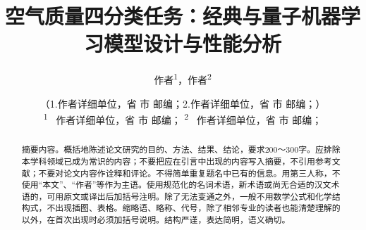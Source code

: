 \documentclass[10pt,a4paper,twoside]{article}
\title{\heiti \zihao{-2} 空气质量四分类任务：经典与量子机器学习模型设计与性能分析}%
\author{\kaishu \zihao{4} 作者\textsuperscript{1}，作者\textsuperscript{2}}%
\date{{\kaishu \zihao{5} （1.作者详细单位，省 市 邮编；2.作者详细单位，省 市 邮编；）}\\
\textsuperscript{1}~{\kaishu \zihao{5} 作者详细单位，省 市 邮编；} 
\textsuperscript{2}~{\kaishu \zihao{5} 作者详细单位，省 市 邮编；}}%
\numberwithin{figure}{section}%
\numberwithin{table}{section}%
\begin{document}

\songti%

\maketitle%



\renewcommand{\abstractname}{\zihao{-5} \heiti \mdseries 摘\quad 要}
\begin{abstract}
    摘要内容。概括地陈述论文研究的目的、方法、结果、结论，要求200～300字。应排除本学科领域已成为常识的内容；不要把应在引言中出现的内容写入摘要，不引用参考文献；不要对论文内容作诠释和评论。不得简单重复题名中已有的信息。用第三人称，不使用“本文”、“作者”等作为主语。使用规范化的名词术语，新术语或尚无合适的汉文术语的，可用原文或译出后加括号注明。除了无法变通之外，一般不用数学公式和化学结构式，不出现插图、表格。缩略语、略称、代号，除了相邻专业的读者也能清楚理解的以外，在首次出现时必须加括号说明。结构严谨，表达简明，语义确切。
    \par {}
    \par {}
\end{abstract}
\end{document}
